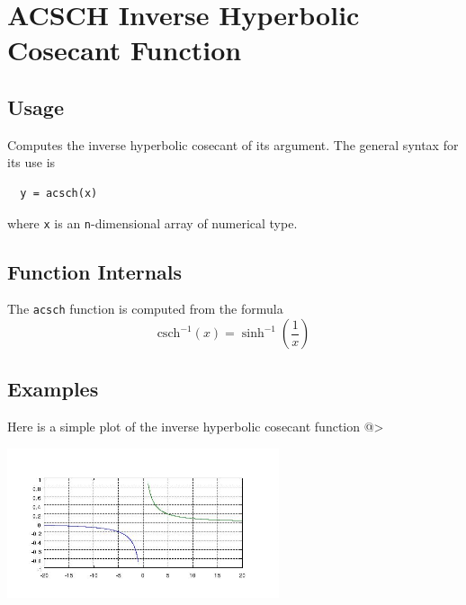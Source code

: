 \section{ACSCH Inverse Hyperbolic Cosecant Function}

\subsection{Usage}

Computes the inverse hyperbolic cosecant of its argument.  The general
syntax for its use is
\begin{verbatim}
  y = acsch(x)
\end{verbatim}
where \verb|x| is an \verb|n|-dimensional array of numerical type.
\subsection{Function Internals}

The \verb|acsch| function is computed from the formula
\[
   \mathrm{csch}^{-1}(x) = \sinh^{-1}\left(\frac{1}{x}\right)
\]
\subsection{Examples}

Here is a simple plot of the inverse hyperbolic cosecant function
@>


\centerline{\includegraphics[width=8cm]{acschplot}}

